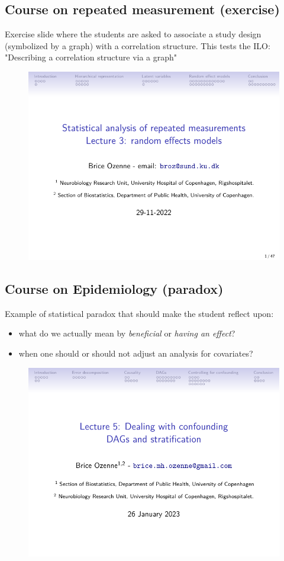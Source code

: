 \documentclass[12pt]{article}
\begin{document}
\subsection{Course on repeated measurement (exercise)}
\label{appendix-quizz}
Exercise slide where the students are asked to associate a study
design (symbolized by a graph) with a correlation structure. This
tests the ILO: "Describing a correlation structure via a graph"
\begin{figure}[!h]
\centering
\includegraphics[trim={0 0 0 0}, page = 21, width=1\textwidth]{./figures/repMes-randomEffects-lecture.pdf}
\label{fig:lmm-slide-wiw}
\end{figure}

\clearpage

\subsection{Course on Epidemiology (paradox)}
\label{appendix-paradox}
Example of statistical paradox that should make the student reflect
upon:
\begin{itemize}
\item what do we actually mean by \emph{beneficial} or \emph{having an effect}?
\item when one should or should not adjust an analysis for covariates?
\end{itemize}

\begin{figure}[!h]
\centering
\includegraphics[trim={0 0 0 0}, page = 20, width=1\textwidth]{./figures/L5-confounding.pdf}
\label{fig:lmm-slide-wiw}
\end{figure}
\end{document}
